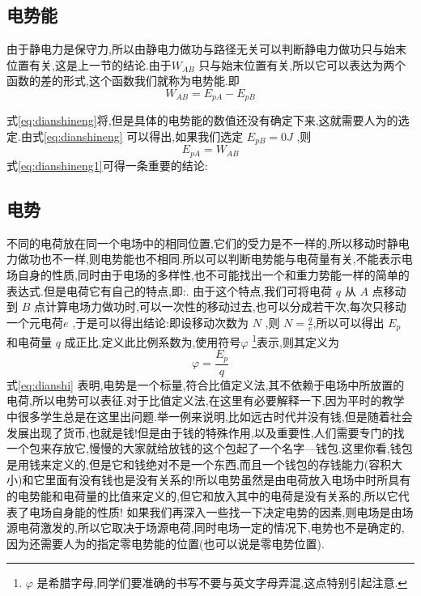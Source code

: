   \subsection{电势能}
  由于静电力是保守力,所以由静电力做功与路径无关可以判断静电力做功只与始末位置有关,这是上一节的结论.由于$W_{AB}$ 只与始末位置有关,所以它可以表达为两个函数的差的形式,这个函数我们就称为电势能.即
  \begin{equation}
    W_{AB}=E_{pA}-E_{pB}
    \label{eq:dianshineng}
  \end{equation}

  式\eqref{eq:dianshineng}将,但是具体的电势能的数值还没有确定下来,这就需要人为的选定.由式\eqref{eq:dianshineng} 可以得出,如果我们选定 $E_{pB}=0 J$ ,则
  \begin{equation}
    E_{pA}=W_{AB}
    \label{eq:dianshineng1}
  \end{equation}
  式\eqref{eq:dianshineng1}可得一条重要的结论:

  \subsection{电势}

  不同的电荷放在同一个电场中的相同位置,它们的受力是不一样的,所以移动时静电力做功也不一样,则电势能也不相同.所以可以判断电势能与电荷量有关,不能表示电场自身的性质,同时由于电场的多样性,也不可能找出一个和重力势能一样的简单的表达式.但是电荷它有自己的特点,即:. 由于这个特点,我们可将电荷 $q$ 从 $A$ 点移动到 $B$ 点计算电场力做功时,可以一次性的移动过去,也可以分成若干次,每次只移动一个元电荷$e$ ,于是可以得出结论:即设移动次数为 $N$ ,则 $N=\frac{q}{e}$,所以可以得出 $E_p$ 和电荷量 $q$ 成正比,定义此比例系数为,使用符号$\varphi$ \footnote{$\varphi$ 是希腊字母,同学们要准确的书写不要与英文字母弄混,这点特别引起注意.}表示,则其定义为
  \begin{equation}
    \varphi=\frac{E_p}{q}
    \label{eq:dianshi}
  \end{equation}
  式\eqref{eq:dianshi} 表明,电势是一个标量,符合比值定义法,其不依赖于电场中所放置的电荷,所以电势可以表征.对于比值定义法,在这里有必要解释一下,因为平时的教学中很多学生总是在这里出问题.举一例来说明,比如远古时代并没有钱,但是随着社会发展出现了货币,也就是钱!但是由于钱的特殊作用,以及重要性,人们需要专门的找一个包来存放它,慢慢的大家就给放钱的这个包起了一个名字---钱包.这里你看,钱包是用钱来定义的,但是它和钱绝对不是一个东西,而且一个钱包的存钱能力(容积大小)和它里面有没有钱也是没有关系的!所以电势虽然是由电荷放入电场中时所具有的电势能和电荷量的比值来定义的,但它和放入其中的电荷是没有关系的,所以它代表了电场自身能的性质! 如果我们再深入一些找一下决定电势的因素,则电场是由场源电荷激发的,所以它取决于场源电荷,同时电场一定的情况下,电势也不是确定的,因为还需要人为的指定零电势能的位置(也可以说是零电势位置).

